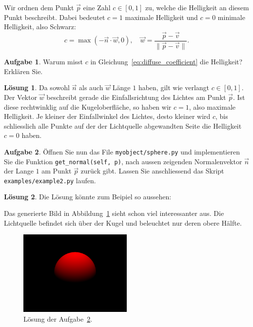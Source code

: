 \documentclass[12pt,a4paper]{article}
\theoremstyle{definition}
\newtheorem{aufgabe}{Aufgabe}
\theoremstyle{definition}
\newtheorem*{losung*}{Lösung}
\begin{document}
	Wir ordnen dem Punkt $\vec{p}$ eine Zahl $c\in\left[0,1\right]$ zu, welche die Helligkeit an diesem Punkt beschreibt.
	Dabei bedeutet $c=1$ maximale Helligkeit und $c=0$ minimale Helligkeit, also Schwarz:
	\begin{equation}\label{eq:diffuse_coefficient}
		c=\max\left(-\vec{n}\cdot\vec{w}, 0\right),\quad
		\vec{w}=\frac{\vec{p}-\vec{v}}{\lVert\vec{p}-\vec{v}\rVert}.
	\end{equation}
	\begin{aufgabe}\label{aufg:diffuse_coefficient}
		Warum misst $c$ in Gleichung~\eqref{eq:diffuse_coefficient} die Helligkeit? Erklären Sie.
	\end{aufgabe}
	\begin{losung*}
		Da sowohl $\vec{n}$ als auch $\vec{w}$ Länge $1$ haben, gilt wie verlangt $c\in\left[0,1\right]$.
		Der Vektor $\vec{w}$ beschreibt gerade die Einfallsrichtung des Lichtes am Punkt $\vec{p}$.
		Ist diese rechtwinklig auf die Kugeloberfläche, so haben wir $c=1$, also maximale Helligkeit.
		Je kleiner der Einfallwinkel des Lichtes, desto kleiner wird $c$, bis schliesslich alle  Punkte auf der der Lichtquelle abgewandten Seite die Helligkeit $c=0$ haben.
	\end{losung*}
	\begin{aufgabe}\label{aufg:diffuse_implementation}
		Öffnen Sie nun das File \texttt{myobject/sphere.py} und implementieren Sie die Funktion \texttt{get\_normal(self, p)}, nach aussen zeigenden Normalenvektor $\vec{n}$ der Lange $1$ am Punkt $\vec{p}$ zurück gibt.
		Lassen Sie anschliessend das Skript \texttt{examples/example2.py} laufen.
	\end{aufgabe}
	\begin{losung*}
		Die Lösung könnte zum Beipiel so aussehen:
		
		Das generierte Bild in Abbildung~\ref{fig:solution_diffuse} sieht schon viel interessanter aus.
		Die Lichtquelle befindet sich über der Kugel und beleuchtet nur deren obere Hälfte.
		\begin{figure}[ht]
			\centering
			\includegraphics[width=0.5\textwidth]{images/example2.png}
			\caption{Lösung der Aufgabe~\ref{aufg:diffuse_implementation}.}
			\label{fig:solution_diffuse}
		\end{figure}
	\end{losung*}
\end{document}

